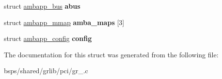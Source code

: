 \begin{DoxyCompactItemize}
\item 
\mbox{\label{structgr701__priv_a8d2f99293ee08e28469fc00e30f9c1cc}} 
struct \mbox{\hyperlink{structambapp__bus}{ambapp\+\_\+bus}} {\bfseries abus}
\item 
\mbox{\label{structgr701__priv_a5e9b6630d3834b96389191af92aabb51}} 
struct \mbox{\hyperlink{structambapp__mmap}{ambapp\+\_\+mmap}} {\bfseries amba\+\_\+maps} \mbox{[}3\mbox{]}
\item 
\mbox{\label{structgr701__priv_a75787d5656a6a03ea9aa6b77e416621c}} 
struct \mbox{\hyperlink{structambapp__config}{ambapp\+\_\+config}} {\bfseries config}
\end{DoxyCompactItemize}


The documentation for this struct was generated from the following file\+:\begin{DoxyCompactItemize}
\item 
bsps/shared/grlib/pci/gr\+\_.\+c\end{DoxyCompactItemize}
